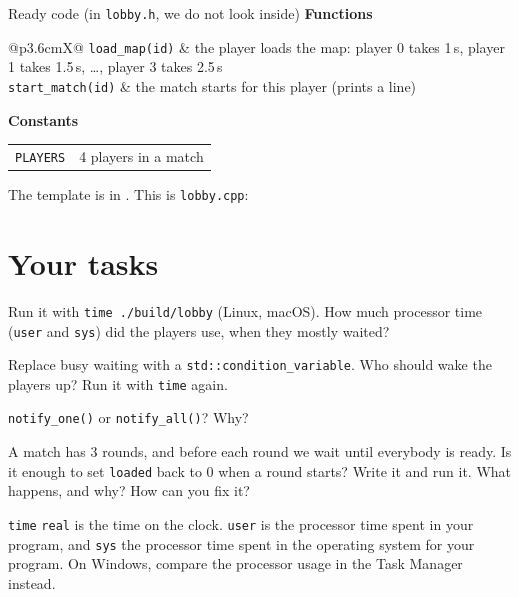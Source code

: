 \begin{note}{Ready code (in \texttt{lobby.h}, we do not look inside)}
\textbf{Functions}\\[2pt]
\begin{tabularx}{\linewidth}{@{}p{3.6cm}X@{}}
\texttt{load\_map(id)} & the player loads the map: player 0 takes 1\,s, player 1 takes 1.5\,s, \dots, player 3 takes 2.5\,s \\
\texttt{start\_match(id)} & the match starts for this player (prints a line) \\
\end{tabularx}
\par\smallskip\textbf{Constants}\\[2pt]
\begin{tabularx}{\linewidth}{@{}p{3.6cm}X@{}}
\texttt{PLAYERS} & 4 players in a match \\
\end{tabularx}
\end{note}

The template is in . This is \texttt{lobby.cpp}:


\runline

\section{Your tasks}

\begin{questions}
  \item Run it with \texttt{time ./build/lobby} (Linux, macOS). How much processor time (\texttt{user} and
        \texttt{sys}) did the players use, when they mostly waited?
  \item Replace busy waiting with a \texttt{std::condition\_variable}. Who should wake the players up?
        Run it with \texttt{time} again.
  \item \texttt{notify\_one()} or \texttt{notify\_all()}? Why?
  \item A match has 3 rounds, and before each round we wait until everybody is ready. Is it enough to set
        \texttt{loaded} back to 0 when a round starts? Write it and run it. What happens, and why?
        How can you fix it?
\end{questions}

\begin{note}{\texttt{time}}
\texttt{real} is the time on the clock. \texttt{user} is the processor time spent in your program, and
\texttt{sys} the processor time spent in the operating system for your program. On Windows, compare the
processor usage in the Task Manager instead.
\end{note}
